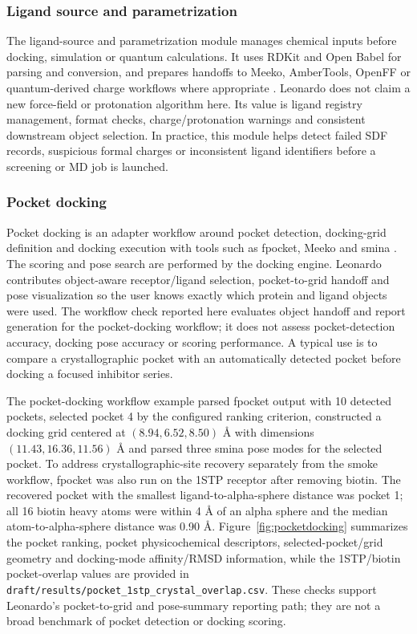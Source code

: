 \documentclass[pdflatex,sn-vancouver-num]{sn-jnl}
\begin{document}
\subsubsection{Ligand source and parametrization}

The ligand-source and parametrization module manages chemical inputs before docking, simulation or quantum calculations.  It uses RDKit and Open Babel for parsing and conversion, and prepares handoffs to Meeko, AmberTools, OpenFF or quantum-derived charge workflows where appropriate \cite{rdkit,openbabel2011,meeko,ambertools,openff2018}.  Leonardo does not claim a new force-field or protonation algorithm here.  Its value is ligand registry management, format checks, charge/protonation warnings and consistent downstream object selection.  In practice, this module helps detect failed SDF records, suspicious formal charges or inconsistent ligand identifiers before a screening or MD job is launched.

\subsubsection{Pocket docking}

Pocket docking is an adapter workflow around pocket detection, docking-grid definition and docking execution with tools such as fpocket, Meeko and smina \cite{fpocket2009,smina2013,meeko}.  The scoring and pose search are performed by the docking engine.  Leonardo contributes object-aware receptor/ligand selection, pocket-to-grid handoff and pose visualization so the user knows exactly which protein and ligand objects were used.  The workflow check reported here evaluates object handoff and report generation for the pocket-docking workflow; it does not assess pocket-detection accuracy, docking pose accuracy or scoring performance.  A typical use is to compare a crystallographic pocket with an automatically detected pocket before docking a focused inhibitor series.

The pocket-docking workflow example parsed fpocket output with 10 detected pockets, selected pocket 4 by the configured ranking criterion, constructed a docking grid centered at $(8.94, 6.52, 8.50)$ \AA{} with dimensions $(11.43, 16.36, 11.56)$ \AA{} and parsed three smina pose modes for the selected pocket.  To address crystallographic-site recovery separately from the smoke workflow, fpocket was also run on the 1STP receptor after removing biotin.  The recovered pocket with the smallest ligand-to-alpha-sphere distance was pocket 1; all 16 biotin heavy atoms were within 4 \AA{} of an alpha sphere and the median atom-to-alpha-sphere distance was 0.90 \AA{}.  Figure~\ref{fig:pocketdocking} summarizes the pocket ranking, pocket physicochemical descriptors, selected-pocket/grid geometry and docking-mode affinity/RMSD information, while the 1STP/biotin pocket-overlap values are provided in \texttt{draft/results/pocket\_1stp\_crystal\_overlap.csv}.  These checks support Leonardo's pocket-to-grid and pose-summary reporting path; they are not a broad benchmark of pocket detection or docking scoring.
\end{document}

